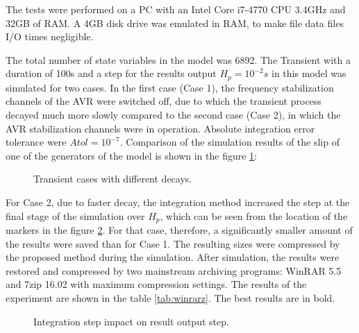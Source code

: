 \documentclass[lettersize,journal]{IEEEtran}
\begin{document}
The tests were performed on a PC with an Intel Core i7-4770 CPU 3.4GHz and 32GB of RAM. A 4GB disk drive 
was emulated in RAM, to make file data files I/O times negligible.

The total number of state variables in the model was 6892. 
The Transient with a duration of 100s and a step for the results output \(H_p=10^{-2}s\) in this 
model was simulated for two cases. In the first case (Case 1), the frequency stabilization channels 
of the AVR were switched off, due to which the transient process decayed much more slowly compared to 
the second case (Case 2), in which the AVR stabilization channels were in operation. 
Absolute integration error tolerance were \(Atol=10^{-7}\). Comparison of the simulation results of 
the slip of one of the generators of the model is shown in the figure \ref{fig_cases1}:

\begin{figure}[h]
	\centering
	\caption{Transient cases with different decays.}
	\label{fig_cases1}
\end{figure}
For Case 2, due to faster decay, the integration method increased the step at the final stage of the
 simulation over \(H_p\), which can be seen from the location of the markers in the 
 figure \ref{fig_cases2}. For that case, therefore, a significantly smaller amount of 
the  results were saved than for Case 1. The resulting sizes were compressed by the proposed method during 
 the simulation. After simulation, the results were restored and compressed by two mainstream 
 archiving programs: WinRAR 5.5 and 7zip 16.02 with maximum compression settings.
 The results of the experiment are shown in the table \ref{tab:winrarz}. The best results are in bold.
  
\begin{figure}[h]
	\centering
	\caption{Integration step impact on result output step.}
	\label{fig_cases2}
\end{figure}
\end{document}
